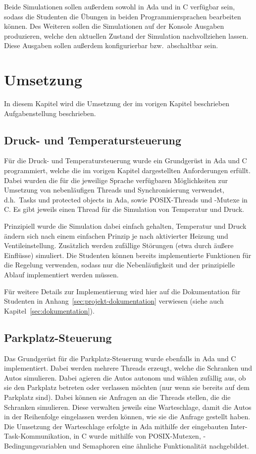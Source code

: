 \documentclass[oneside]{elaboration}
\begin{document}
Beide Simulationen sollen außerdem sowohl in Ada und in C verfügbar sein, sodass
die Studenten die Übungen in beiden Programmiersprachen bearbeiten können.
Des Weiteren sollen die Simulationen auf der Konsole Ausgaben produzieren,
welche den aktuellen Zustand der Simulation nachvollziehen lassen. Diese
Ausgaben sollen außerdem konfigurierbar bzw.\ abschaltbar sein.

\chapter{Umsetzung}
\label{chp:umsetzung}

In diesem Kapitel wird die Umsetzung der im vorigen Kapitel beschrieben
Aufgabenstellung beschrieben.

\section{Druck- und Temperatursteuerung}
\label{sec:druck-_und_temperatursteuerung}

Für die Druck- und Temperatursteuerung wurde ein Grundgerüst in Ada und C
programmiert, welche die im vorigen Kapitel dargestellten Anforderungen erfüllt.
Dabei wurden die für die jeweilige Sprache verfügbaren Möglichkeiten zur
Umsetzung von nebenläufigen Threads und Synchronisierung verwendet, d.h.\ Tasks
und protected objects in Ada, sowie POSIX-Threads und -Mutexe in C. Es gibt
jeweils einen Thread für die Simulation von Temperatur und Druck.

Prinzipiell wurde die Simulation dabei einfach gehalten, Temperatur und Druck
ändern sich nach einem einfachen Prinzip je nach aktivierter Heizung und
Ventileinstellung. Zusätzlich werden zufällige Störungen (etwa durch äußere
Einflüsse) simuliert. Die Studenten können bereits implementierte Funktionen für
die Regelung verwenden, sodass nur die Nebenläufigkeit und der prinzipielle
Ablauf implementiert werden müssen.

Für weitere Details zur Implementierung wird hier auf die Dokumentation für
Studenten in Anhang~\ref{sec:projekt-dokumentation} verwiesen (siehe auch
Kapitel~\ref{sec:dokumentation}).

\section{Parkplatz-Steuerung}
\label{sec:parkplatz-steuerung}

Das Grundgerüst für die Parkplatz-Steuerung wurde ebenfalls in Ada und C
implementiert. Dabei werden mehrere Threads erzeugt, welche die Schranken und
Autos simulieren. Dabei agieren die Autos autonom und wählen zufällig aus, ob
sie den Parkplatz betreten oder verlassen möchten (nur wenn sie bereits auf dem
Parkplatz sind). Dabei können sie Anfragen an die Threads stellen, die die
Schranken simulieren. Diese verwalten jeweils eine Warteschlage, damit die Autos
in der Reihenfolge eingelassen werden können, wie sie die Anfrage gestellt
haben. Die Umsetzung der Warteschlage erfolgte in Ada mithilfe der eingebauten
Inter-Task-Kommunikation, in C wurde mithilfe von POSIX-Mutexen,
-Bedingungsvariablen und Semaphoren eine ähnliche Funktionalität nachgebildet.
\end{document}

